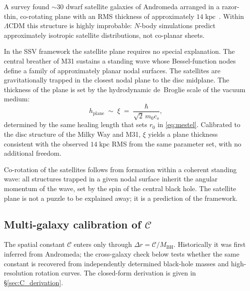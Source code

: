 \documentclass[11pt,a4paper]{article}
\begin{document}
A survey found $\sim30$ dwarf satellite galaxies of Andromeda arranged in a razor-thin,
co-rotating plane with an RMS thickness of approximately $14\;\mathrm{kpc}$~\cite{ibata2013}.
Within $\Lambda$CDM this structure is highly improbable: $N$-body simulations predict
approximately isotropic satellite distributions, not co-planar sheets.

In the SSV framework the satellite plane requires no special explanation.  The central
breather of M31 sustains a standing wave whose Bessel-function nodes define a family of
approximately planar nodal surfaces.  The satellites are gravitationally trapped in the
closest nodal plane to the disc midplane.  The thickness of the plane is set by the
hydrodynamic de~Broglie scale of the vacuum medium:
\begin{equation}
  h_\mathrm{plane} \;\sim\; \xi \;=\; \frac{\hbar}{\sqrt{2}\,m_0 c_s},
  \label{eq:thickness}
\end{equation}
determined by the same healing length that sets $r_0$ in \eqref{eq:mestel}.  Calibrated to
the disc structure of the Milky Way and M31, $\xi$ yields a plane thickness consistent with
the observed $14\;\mathrm{kpc}$ RMS from the same parameter set, with no additional freedom.

Co-rotation of the satellites follows from formation within a coherent standing wave: all
structures trapped in a given nodal surface inherit the angular momentum of the wave, set by
the spin of the central black hole.  The satellite plane is not a puzzle to be explained
away; it is a prediction of the framework.

\subsection{Multi-galaxy calibration of $\mathcal{C}$}

The spatial constant $\mathcal{C}$ enters only through
$\Delta r = \mathcal{C}/M_\mathrm{BH}$.  Historically it was first inferred from
Andromeda; the cross-galaxy check below tests whether the same constant is recovered from
independently determined black-hole masses and high-resolution rotation curves.  The
closed-form derivation is given in \S\ref{sec:C_derivation}.
\end{document}
